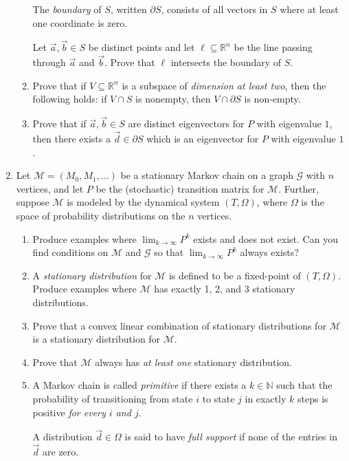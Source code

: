 \documentclass[letter]{article}
\newcommand{\R}{\mathbb{R}}
\newcommand{\N}{\mathbb{N}}
\begin{document}
\begin{enumerate}
\begin{enumerate}
				The \emph{boundary} of $S$, written $\partial S$, consists of all vectors in $S$ where at least one coordinate
				is zero.

				Let $\vec a,\vec b\in S$ be distinct points and let $\ell\subseteq \R^n$ be the line passing through $\vec a$
				and $\vec b$. Prove that $\ell$ intersects the boundary of $S$.
			\item Prove that if $V\subseteq \R^n$ is a subspace of \emph{dimension at
				least two}, then the following holds: if $V\cap S$ is nonempty, then $V\cap \partial S$ is non-empty.
			\item Prove that if $\vec a,\vec b\in S$ are distinct eigenvectors for $P$ with eigenvalue $1$, then there
				exists a $\vec d\in \partial S$ which is an eigenvector for $P$ with eigenvalue $1$.
		\end{enumerate}

		\item Let $\mathcal M=(M_0,M_1,\ldots)$ be a stationary Markov chain on a graph $\mathcal G$
			with $n$ vertices, and let $P$ be the (stochastic) transition matrix for $\mathcal M$. 
			Further, suppose $\mathcal M$ is modeled by the dynamical system $(T,\Omega)$,
			where $\Omega$ is the space of probability distributions on the $n$ vertices.
		\begin{enumerate}
			\item Produce examples where $\lim_{k\to\infty} P^k$ exists and does not exist. Can you find
				conditions on $\mathcal M$ and $\mathcal G$ so that $\lim_{k\to\infty} P^k$ always exists?
			\item A \emph{stationary distribution} for $\mathcal M$ is defined to be a fixed-point of 
				$(T,\Omega)$. Produce examples where $\mathcal M$ has exactly 1, 2, and 3 stationary distributions.

			\item Prove that a convex linear combination of stationary distributions for $\mathcal M$ 
				is a stationary distribution for $\mathcal M$.

			\item Prove that $\mathcal M$ always has \emph{at least one} stationary distribution.

			\item A Markov chain is called \emph{primitive} if there exists a $k\in \N$ such that
				the probability of transitioning from state $i$ to state $j$ in exactly $k$ steps
				is positive \emph{for every $i$ and $j$}.

				\smallskip
				A distribution $\vec d\in \Omega$ is said to have \emph{full support} if none of the entries
				in $\vec d$ are zero.


\end{enumerate}
\end{enumerate}
\end{document}
